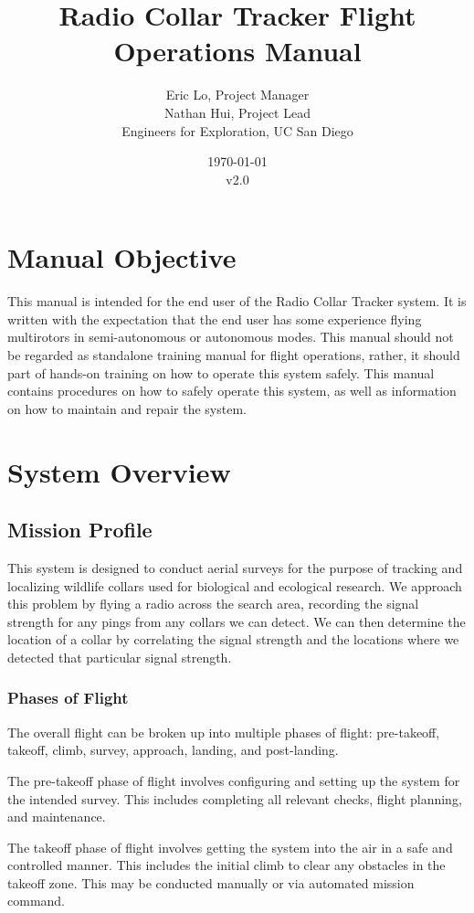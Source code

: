 \documentclass{report}
\title{Radio Collar Tracker Flight Operations Manual}
\author{Eric Lo, Project Manager\\Nathan Hui, Project Lead\\Engineers for Exploration, UC San Diego}
\date{\today\\v2.0}
\begin{document}
\maketitle
\tableofcontents
\chapter{Manual Objective}
	This manual is intended for the end user of the Radio Collar Tracker system.  It is written with the expectation that the end user has some experience flying \glspl{multirotor} in semi-autonomous or autonomous modes.  This manual should not be regarded as standalone training manual for flight operations, rather, it should part of hands-on training on how to operate this system safely.  This manual contains procedures on how to safely operate this system, as well as information on how to maintain and repair the system.
\chapter{System Overview}
	\section{Mission Profile}
		This system is designed to conduct aerial surveys for the purpose of tracking and localizing wildlife collars used for biological and ecological research.  We approach this problem by flying a radio across the search area, recording the signal strength for any pings from any collars we can detect.  We can then determine the location of a collar by correlating the signal strength and the locations where we detected that particular signal strength.

		\subsection{Phases of Flight}
			The overall flight can be broken up into multiple phases of flight: pre-takeoff, takeoff, climb, survey, approach, landing, and post-landing.

			The pre-takeoff phase of flight involves configuring and setting up the system for the intended survey.  This includes completing all relevant checks, flight planning, and maintenance.

			The takeoff phase of flight involves getting the system into the air in a safe and controlled manner.  This includes the initial climb to clear any obstacles in the takeoff zone.  This may be conducted manually or via automated mission command.
\end{document}

